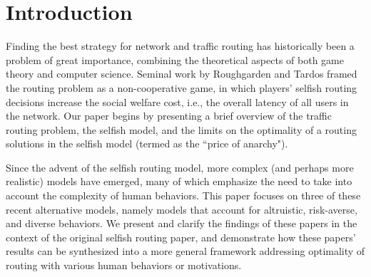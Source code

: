 \section{Introduction}
Finding the best strategy for network and traffic routing has historically been a problem of great importance, combining the theoretical aspects of both game theory and computer science. 
Seminal work by Roughgarden and Tardos framed the routing problem as a non-cooperative game,
in which players' selfish routing decisions increase the social welfare cost, i.e., the overall latency of all users in the network.
Our paper begins by presenting a brief overview of the traffic routing problem, the selfish model, and the limits on the optimality of a routing solutions in the selfish model (termed as the ``price of anarchy"). 

Since the advent of the selfish routing model, more complex (and perhaps more realistic) models have emerged, many of which emphasize the need to take into account the complexity of human behaviors.
This paper focuses on three of these recent alternative models, namely models that account for altruistic, risk-averse, and diverse behaviors. We present and clarify the findings of these papers in the context of the original selfish routing paper, and demonstrate how these papers' results can be synthesized into a more general framework addressing optimality of routing with various human behaviors or motivations.


